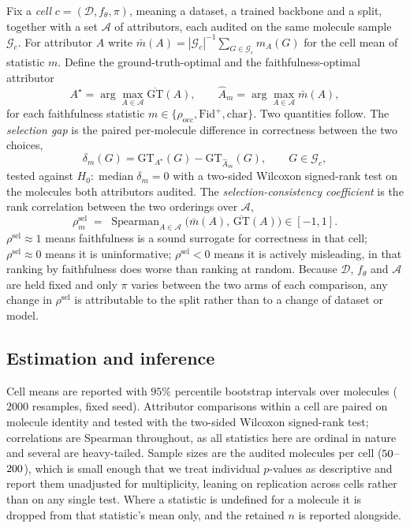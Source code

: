 Fix a \emph{cell} $c=(\mathcal{D},f_\theta,\pi)$, meaning a dataset, a trained
backbone and a split, together with a set $\mathcal{A}$ of attributors, each audited on
the same molecule sample $\mathcal{G}_c$. For attributor $A$ write
$\bar m(A)=|\mathcal{G}_c|^{-1}\sum_{G\in\mathcal{G}_c} m_A(G)$ for the cell
mean of statistic $m$. Define the ground-truth-optimal and the
faithfulness-optimal attributor
\begin{equation}
  A^{\star} = \arg\max_{A\in\mathcal{A}} \overline{\mathrm{GT}}(A),
  \qquad
  \hat A_m = \arg\max_{A\in\mathcal{A}} \bar m(A),
  \label{eq:argmax}
\end{equation}
for each faithfulness statistic $m\in\{\rho_{\mathrm{occ}},\mathrm{Fid}^{+},
\mathrm{char}\}$. Two quantities follow. The \emph{selection gap} is the paired
per-molecule difference in correctness between the two choices,
\begin{equation}
  \delta_m(G) = \mathrm{GT}_{A^{\star}}(G)-\mathrm{GT}_{\hat A_m}(G),
  \qquad G\in\mathcal{G}_c ,
  \label{eq:gap}
\end{equation}
tested against $H_0:\operatorname{median}\delta_m=0$ with a two-sided Wilcoxon
signed-rank test on the molecules both attributors audited. The
\emph{selection-consistency coefficient} is the rank correlation between the
two orderings over $\mathcal{A}$,
\begin{equation}
  \rho_{m}^{\mathrm{sel}} \;=\;
  \operatorname{Spearman}_{A\in\mathcal{A}}\!\big(\bar m(A),\,
  \overline{\mathrm{GT}}(A)\big) \in[-1,1].
  \label{eq:selrho}
\end{equation}
$\rho^{\mathrm{sel}}\!\approx\!1$ means faithfulness is a sound surrogate for
correctness in that cell; $\rho^{\mathrm{sel}}\!\approx\!0$ means it is
uninformative; $\rho^{\mathrm{sel}}<0$ means it is actively misleading, in that
ranking by faithfulness does worse than ranking at random. Because
$\mathcal{D}$, $f_\theta$ and $\mathcal{A}$ are held fixed and only $\pi$
varies between the two arms of each comparison, any change in
$\rho^{\mathrm{sel}}$ is attributable to the split rather than to a change of
dataset or model.

\subsection{Estimation and inference}

Cell means are reported with $95\%$ percentile bootstrap intervals over
molecules ($2000$ resamples, fixed seed). Attributor comparisons within a cell
are paired on molecule identity and tested with the two-sided Wilcoxon
signed-rank test; correlations are Spearman throughout, as all statistics here
are ordinal in nature and several are heavy-tailed. Sample sizes are the
audited molecules per cell ($50{}$--$200{}$), which is small enough that we treat
individual $p$-values as descriptive and report them unadjusted for
multiplicity, leaning on replication across cells rather than on any single
test. Where a statistic is undefined for a molecule it is dropped from that
statistic's mean only, and the retained $n$ is reported alongside.

